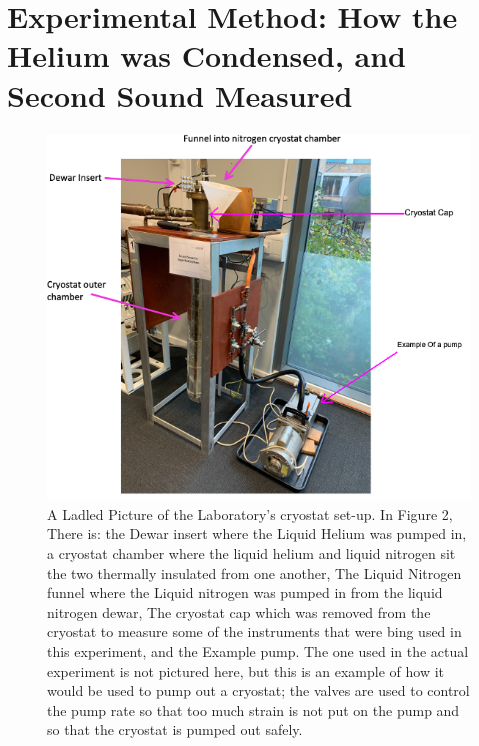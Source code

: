 \documentclass[a4paper,11pt]{article}
\begin{document}
\section{Experimental Method: How the Helium was Condensed, and Second Sound Measured}

\begin{figure}[hbt!]
    \centering
    \includegraphics[scale=0.8]{Picture 1.png}
    \caption{A Ladled Picture of the Laboratory's cryostat set-up. In Figure 2, There is: the Dewar insert where the Liquid Helium was pumped in, a cryostat chamber where the liquid helium and liquid nitrogen sit the two thermally insulated from one another, The Liquid Nitrogen funnel where the Liquid nitrogen was pumped in from the liquid nitrogen dewar, The cryostat cap which was removed from the cryostat to measure some of the instruments that were bing used in this experiment, and the Example pump. The one used in the actual experiment is not pictured here, but this is an example of how it would be used to pump out a cryostat; the valves are used to control the pump rate so that too much strain is not put on the pump and so that the cryostat is pumped out safely.}
    \label{fig:Lable Cryostat Picture}
\end{figure}
 \\
\end{document}
